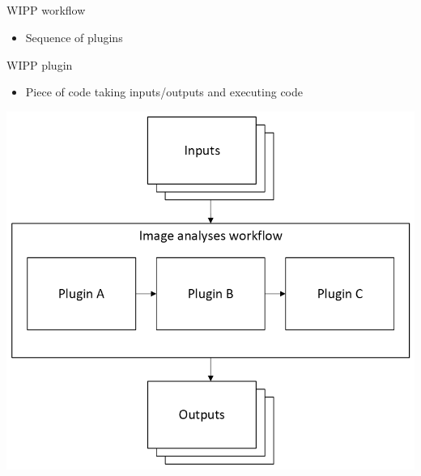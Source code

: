 \subsection{\slidetitle}
\begin{frame}
  \frametitle{\sectiontitle}
  \framesubtitle{\slidetitle}

  \begin{minipage}[h!]{0.40\textwidth}
    WIPP workflow
    \begin{itemize}
      \item Sequence of plugins
    \end{itemize}

    \bigskip

    WIPP plugin
    \begin{itemize}
      \item Piece of code taking inputs/outputs and executing code
    \end{itemize}
  \end{minipage}\hfill
  \begin{minipage}[h!]{0.55\textwidth}
    \includegraphics[scale=0.55]{./img/2_plugins.png}
  \end{minipage}
\end{frame}

\def\slidetitle{AI model cards}

